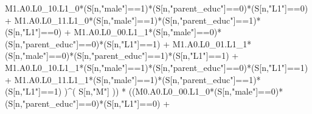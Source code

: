 \documentclass[
]{book}
\newenvironment{Shaded}{\begin{snugshade}}{\end{snugshade}}
\newcommand{\DecValTok}[1]{\textcolor[rgb]{0.00,0.00,0.81}{#1}}
\newcommand{\NormalTok}[1]{#1}
\newcommand{\SpecialCharTok}[1]{\textcolor[rgb]{0.00,0.00,0.00}{#1}}
\newcommand{\StringTok}[1]{\textcolor[rgb]{0.31,0.60,0.02}{#1}}
\begin{document}
\begin{Shaded}
\begin{Highlighting}[]
\NormalTok{          M1.A0.L0\_10.L1\_0}\SpecialCharTok{*}\NormalTok{(S[n,}\StringTok{"male"}\NormalTok{]}\SpecialCharTok{==}\DecValTok{1}\NormalTok{)}\SpecialCharTok{*}\NormalTok{(S[n,}\StringTok{"parent\_educ"}\NormalTok{]}\SpecialCharTok{==}\DecValTok{0}\NormalTok{)}\SpecialCharTok{*}\NormalTok{(S[n,}\StringTok{"L1"}\NormalTok{]}\SpecialCharTok{==}\DecValTok{0}\NormalTok{) }\SpecialCharTok{+} 
\NormalTok{          M1.A0.L0\_11.L1\_0}\SpecialCharTok{*}\NormalTok{(S[n,}\StringTok{"male"}\NormalTok{]}\SpecialCharTok{==}\DecValTok{1}\NormalTok{)}\SpecialCharTok{*}\NormalTok{(S[n,}\StringTok{"parent\_educ"}\NormalTok{]}\SpecialCharTok{==}\DecValTok{1}\NormalTok{)}\SpecialCharTok{*}\NormalTok{(S[n,}\StringTok{"L1"}\NormalTok{]}\SpecialCharTok{==}\DecValTok{0}\NormalTok{) }\SpecialCharTok{+}
\NormalTok{          M1.A0.L0\_00.L1\_1}\SpecialCharTok{*}\NormalTok{(S[n,}\StringTok{"male"}\NormalTok{]}\SpecialCharTok{==}\DecValTok{0}\NormalTok{)}\SpecialCharTok{*}\NormalTok{(S[n,}\StringTok{"parent\_educ"}\NormalTok{]}\SpecialCharTok{==}\DecValTok{0}\NormalTok{)}\SpecialCharTok{*}\NormalTok{(S[n,}\StringTok{"L1"}\NormalTok{]}\SpecialCharTok{==}\DecValTok{1}\NormalTok{) }\SpecialCharTok{+}
\NormalTok{          M1.A0.L0\_01.L1\_1}\SpecialCharTok{*}\NormalTok{(S[n,}\StringTok{"male"}\NormalTok{]}\SpecialCharTok{==}\DecValTok{0}\NormalTok{)}\SpecialCharTok{*}\NormalTok{(S[n,}\StringTok{"parent\_educ"}\NormalTok{]}\SpecialCharTok{==}\DecValTok{1}\NormalTok{)}\SpecialCharTok{*}\NormalTok{(S[n,}\StringTok{"L1"}\NormalTok{]}\SpecialCharTok{==}\DecValTok{1}\NormalTok{) }\SpecialCharTok{+}
\NormalTok{          M1.A0.L0\_10.L1\_1}\SpecialCharTok{*}\NormalTok{(S[n,}\StringTok{"male"}\NormalTok{]}\SpecialCharTok{==}\DecValTok{1}\NormalTok{)}\SpecialCharTok{*}\NormalTok{(S[n,}\StringTok{"parent\_educ"}\NormalTok{]}\SpecialCharTok{==}\DecValTok{0}\NormalTok{)}\SpecialCharTok{*}\NormalTok{(S[n,}\StringTok{"L1"}\NormalTok{]}\SpecialCharTok{==}\DecValTok{1}\NormalTok{) }\SpecialCharTok{+}
\NormalTok{          M1.A0.L0\_11.L1\_1}\SpecialCharTok{*}\NormalTok{(S[n,}\StringTok{"male"}\NormalTok{]}\SpecialCharTok{==}\DecValTok{1}\NormalTok{)}\SpecialCharTok{*}\NormalTok{(S[n,}\StringTok{"parent\_educ"}\NormalTok{]}\SpecialCharTok{==}\DecValTok{1}\NormalTok{)}\SpecialCharTok{*}
\NormalTok{          (S[n,}\StringTok{"L1"}\NormalTok{]}\SpecialCharTok{==}\DecValTok{1}\NormalTok{) )}\SpecialCharTok{\^{}}\NormalTok{( S[n,}\StringTok{"M"}\NormalTok{] )) }\SpecialCharTok{*}
\NormalTok{      ((M0.A0.L0\_00.L1\_0}\SpecialCharTok{*}\NormalTok{(S[n,}\StringTok{"male"}\NormalTok{]}\SpecialCharTok{==}\DecValTok{0}\NormalTok{)}\SpecialCharTok{*}\NormalTok{(S[n,}\StringTok{"parent\_educ"}\NormalTok{]}\SpecialCharTok{==}\DecValTok{0}\NormalTok{)}\SpecialCharTok{*}\NormalTok{(S[n,}\StringTok{"L1"}\NormalTok{]}\SpecialCharTok{==}\DecValTok{0}\NormalTok{) }\SpecialCharTok{+}               

\end{Highlighting}
\end{Shaded}
\end{document}

